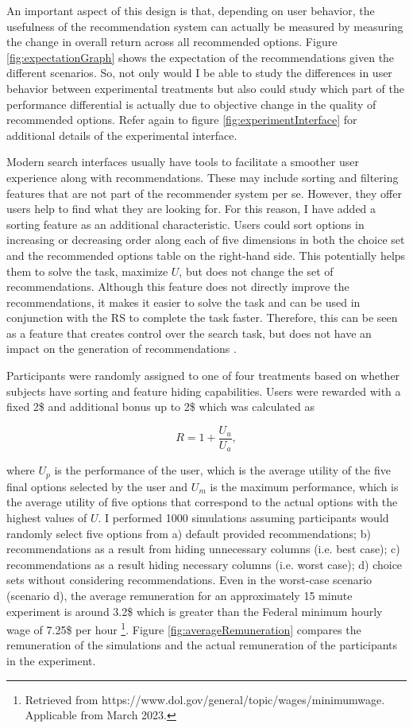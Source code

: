 \documentclass[a4paper,12pt]{article}
\begin{document}
An important aspect of this design is that, depending on user behavior, the usefulness of the recommendation system can actually be measured by measuring the change in overall return across all recommended options. Figure \ref{fig:expectationGraph} shows the expectation of the recommendations given the different scenarios. So, not only would I be able to study the differences in user behavior between experimental treatments but also could study which part of the performance differential is actually due to objective change in the quality of recommended options. Refer again to figure \ref{fig:experimentInterface} for additional details of the experimental interface.

Modern search interfaces usually have tools to facilitate a smoother user experience along with recommendations. These may include sorting and filtering features that are not part of the recommender system per se. However, they offer users help to find what they are looking for. For this reason, I have added a sorting feature as an additional characteristic. Users could sort options in increasing or decreasing order along each of five dimensions in both the choice set and the recommended options table on the right-hand side. This potentially helps them to solve the task, maximize $U$, but does not change the set of recommendations. Although this feature does not directly improve the recommendations, it makes it easier to solve the task and can be used in conjunction with the RS to complete the task faster. Therefore, this can be seen as a feature that creates control over the search task, but does not have an impact on the generation of recommendations \citep{jannach2017user}. 

Participants were randomly assigned to one of four treatments based on whether subjects have sorting and feature hiding capabilities. Users were rewarded with a fixed 2\$ and additional bonus up to 2\$ which was calculated as 

$$R = 1 + \frac{U_u}{U_a} ,$$

where $U_p$ is the performance of the user, which is the average utility of the five final options selected by the user and $U_m$ is the maximum performance, which is the average utility of five options that correspond to the actual options with the highest values of $U$. I performed 1000 simulations assuming participants would randomly select five options from a) default provided recommendations; b) recommendations as a result from hiding unnecessary columns (i.e. best case); c) recommendations as a result hiding necessary columns (i.e. worst case); d) choice sets without considering recommendations. Even in the worst-case scenario (scenario d), the average remuneration for an approximately 15 minute experiment is around 3.2\$ which is greater than the Federal minimum hourly wage  of 7.25\$ per hour \footnote{Retrieved from https://www.dol.gov/general/topic/wages/minimumwage. Applicable from March 2023.}. Figure \ref{fig:averageRemuneration} compares the remuneration of the simulations and the actual remuneration of the participants in the experiment.
\end{document}
